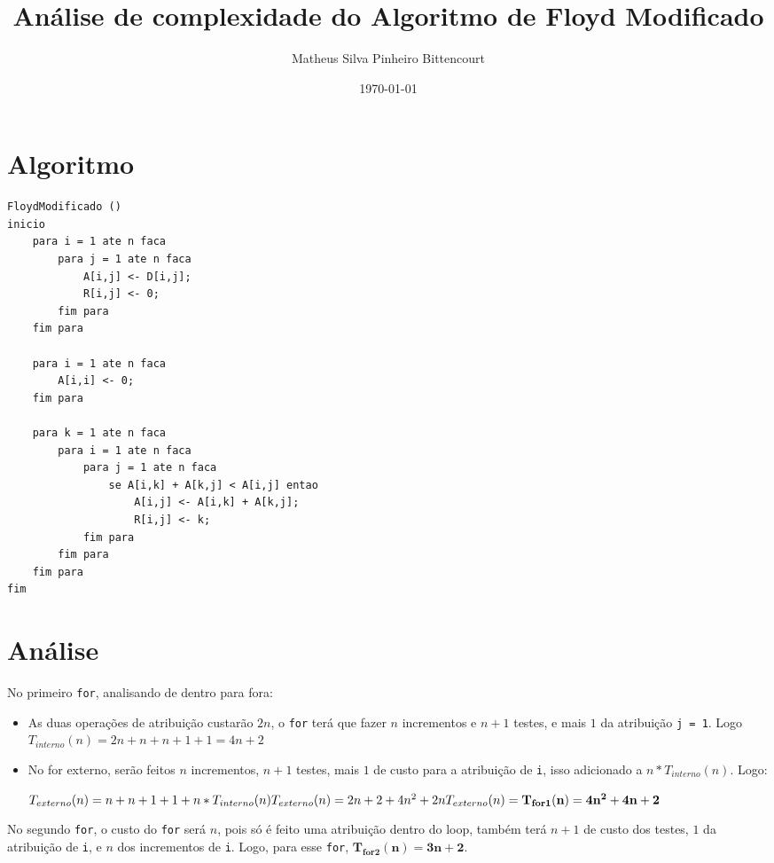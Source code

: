 \documentclass[a4paper, 12pt]{article}
\title{Análise de complexidade do Algoritmo de Floyd Modificado}
\author{Matheus Silva Pinheiro Bittencourt}
\date{\today}
\begin{document}
\maketitle

\section*{Algoritmo}
\begin{lstlisting}
FloydModificado ()
inicio
	para i = 1 ate n faca
		para j = 1 ate n faca
			A[i,j] <- D[i,j];
			R[i,j] <- 0;
		fim para
	fim para

	para i = 1 ate n faca
		A[i,i] <- 0;
	fim para

	para k = 1 ate n faca
		para i = 1 ate n faca
			para j = 1 ate n faca
				se A[i,k] + A[k,j] < A[i,j] entao
					A[i,j] <- A[i,k] + A[k,j];
					R[i,j] <- k;
			fim para
		fim para
	fim para
fim
\end{lstlisting}

\section*{Análise}

No primeiro \verb|for|, analisando de dentro para fora:
\begin{itemize}
	\item As duas operações de atribuição custarão $2n$, o \verb|for| terá que
		fazer $n$ incrementos e $n+1$ testes, e mais $1$ da atribuição
		\verb|j = 1|. Logo $T_{interno}(n) = 2n + n + n + 1 + 1 = 4n + 2$
	\item No for externo, serão feitos $n$ incrementos, $n+1$ testes, mais $1$
		de custo para a atribuição de \verb|i|, isso adicionado a
		$n*T_{interno}(n)$. Logo:

		\begin{math}
			T_{externo}(n) = n + n + 1 + 1 + n*T_{interno}(n) \\
			T_{externo}(n) = 2n + 2 + 4n^2 + 2n \\
			T_{externo}(n) = \mathbf{T_{for1}(n) = 4n^2 + 4n + 2}
		\end{math}
\end{itemize}

No segundo \verb|for|, o custo do \verb|for| será $n$, pois só é feito uma
atribuição dentro do loop, também terá $n+1$ de custo dos testes, $1$ da
atribuição de \verb|i|, e $n$ dos incrementos de \verb|i|. Logo, para esse
\verb|for|, $\mathbf{T_{for2}(n) = 3n + 2}$.

\mbox{}
\end{document}
